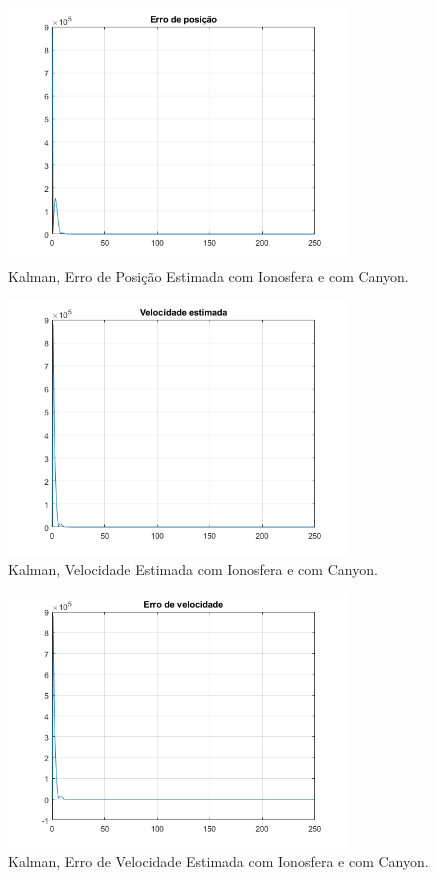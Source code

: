 \documentclass[palatino]{ist-report}
\begin{document}
\begin{figure}[ht]
	\centering
	\includegraphics[width=0.8\textwidth]{kalman_1/2-1-erro_posicao.png}
	\caption{Kalman, Erro de Posição Estimada com Ionosfera e com Canyon.}
	\label{EPosicao21}
\end{figure}

\begin{figure}[ht]
	\centering
	\includegraphics[width=0.8\textwidth]{kalman_1/2-1-velocidade_estimada.png}
	\caption{Kalman, Velocidade Estimada com Ionosfera e com Canyon.}
	\label{Velocidade21}
\end{figure}

\begin{figure}[ht]
	\centering
	\includegraphics[width=0.8\textwidth]{kalman_1/2-1-erro_velocidade.png}
	\caption{Kalman, Erro de Velocidade Estimada com Ionosfera e com Canyon.}
	\label{eVelocidade21}
\end{figure}
\end{document}
